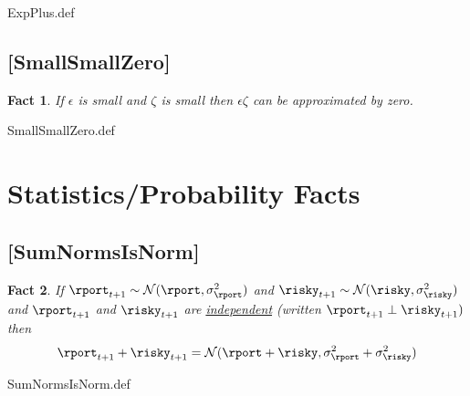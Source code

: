 \documentclass{handout}
\newtheorem{Fact}{Fact}
\begin{document}
\begin{verbatimwrite}{ExpPlus.def}
\providecommand{\ExpPlus}{\href{https://www.econ2.jhu.edu/people/ccarroll/public/LectureNotes/MathFacts/MathFactsList\#ExpPlus}{\ensuremath{\mathtt{[ExpPlus]}}}}
\end{verbatimwrite}

\hypertarget{SmallSmallZero}{}
\subsection{[SmallSmallZero]}\label{fact:SmallSmallZero}

\begin{Fact} If $\epsilon$ is small and $\zeta$ is small then $\epsilon\zeta$ can be 
approximated by zero.
\end{Fact}

\begin{verbatimwrite}{SmallSmallZero.def}
\providecommand{\SmallSmallZero}{\href{https://www.econ2.jhu.edu/people/ccarroll/public/LectureNotes/MathFacts/MathFactsList\#SmallSmallZero}{\ensuremath{\mathtt{[SmallSmallZero]}}}}
\end{verbatimwrite}



\section{Statistics/Probability Facts}

\hypertarget{SumNormsIsNorm}{}
\subsection{[SumNormsIsNorm]}


\begin{Fact} If $\rport_{t+1} \sim \mathcal{N}(\rport,\sigma^{2}_{\rport})$ and $\risky_{t+1} \sim \mathcal{N}(\risky,\sigma^{2}_{\risky})$ and $\rport_{t+1}$ and $\risky_{t+1}$ are \href{http://en.wikipedia.org/wiki/Independence_(probability_theory)}{independent} (written $\rport_{t+1} \perp \risky_{t+1})$ then
\begin{equation}
        \rport_{t+1}+\risky_{t+1} = \mathcal{N}(\rport+\risky,\sigma^{2}_{\rport}+\sigma^{2}_{\risky}) \label{eq:SumNormsIsNorm}
\end{equation}
\end{Fact}

\begin{verbatimwrite}{SumNormsIsNorm.def}
\providecommand{\SumNormsIsNorm}{\href{https://www.econ2.jhu.edu/people/ccarroll/public/LectureNotes/MathFacts/MathFactsList\#SumNormsIsNorm}{\ensuremath{\mathtt{[SumNormsIsNorm]}}}}
\end{verbatimwrite}
\end{document}
